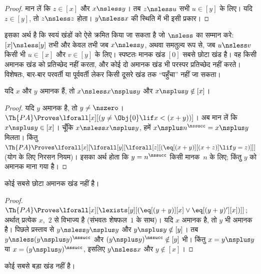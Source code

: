 \documentclass[../../../include/open-logic-section]{subfiles}
\begin{document}
\begin{proof}
मान लें कि $z \in [x]$ और $x \nsless y$। तब $z \nsless u$ सभी $u
\in [y]$ के लिए। यदि $z \in [y]$, तो $z \nsless z$ होता। $y
\nsless x$
की स्थिति में भी इसी प्रकार।
\end{proof}

\begin{explain}
इसका अर्थ है कि स्वयं खंडों को ऐसे क्रमित किया जा सकता है जो $\nsless$ का
सम्मान करे: $[x] \nsless [y]$ तभी और केवल तभी जब $x \nsless y$, अथवा
समतुल्य रूप से, जब $u \nsless v$ किसी भी $u \in [x]$ और $v \in [y]$ के
लिए। स्पष्टतः मानक खंड $[0]$ सबसे छोटा खंड है। वह किसी अमानक खंड
को प्रतिच्छेद नहीं करता, और कोई दो अमानक खंड भी परस्पर प्रतिच्छेद नहीं करते।
विशेषतः, बार-बार परवर्ती या पूर्ववर्ती लेकर किसी दूसरे खंड तक “पहुँचा” नहीं
जा सकता।
\end{explain}

\begin{prop}
यदि $x$ और $y$ अमानक हैं, तो $x \nsless x \nsplus y$ और $x
\nsplus y \notin [x]$।
\end{prop}

\begin{proof}
यदि $y$ अमानक है, तो $y \neq \nszero$। $\Th{PA} \Proves
\lforall[x][(y \neq \Obj{0} \lif x < (x+y))]$। अब मान लें कि $x
\nsplus y \in [x]$। चूँकि $x \nsless x \nsplus y$, हमें $x
\nsplus n^\nssucc = x \nsplus y$ मिलता। किंतु
$\Th{PA} \Proves
\lforall[x][\lforall[y][\lforall[z][(\eq[(x+y)][(x+z)] \lif y = z)]]]$
(योग के लिए निरसन नियम)। इसका अर्थ होता कि $y = n^\nssucc$ किसी मानक~$n$
के लिए; किंतु $y$ को अमानक माना गया है।
\end{proof}

\begin{prop}
कोई सबसे छोटा अमानक खंड नहीं है।
\end{prop}

\begin{proof}
$\Th{PA} \Proves \lforall[x][\lexists[y][(\eq[(y+y)][x] \lor
      \eq[(y+y)'][x])]]$; अर्थात् प्रत्येक $x$,~$2$ से विभाज्य है
  (संभवतः शेषफल~$1$ के साथ)। यदि $x$ अमानक है, तो $y$ भी अमानक है। पिछले
  प्रस्ताव से $y \nsless y \nsplus y$ और $y \nsplus y
  \notin [y]$। तब $y \nsless (y \nsplus y)^\nssucc$ और $(y
  \nsplus y)^\nssucc \notin [y]$ भी। किंतु
  $x = y \nsplus y$ या $x = (y
  \nsplus y)^\nssucc$, इसलिए
  $y \nsless x$ और $y \notin [x]$।
\end{proof}

\begin{prop}
कोई सबसे बड़ा खंड नहीं है।
\end{prop}
\end{document}
